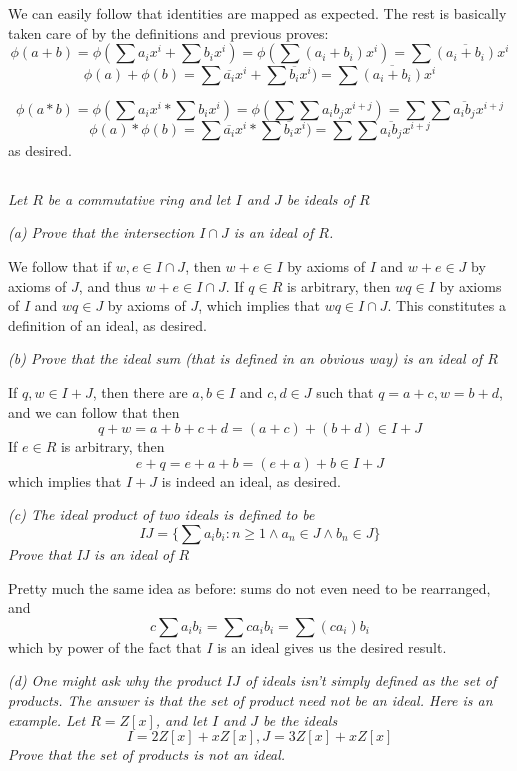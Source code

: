 \documentclass[11pt,oneside,titlepage]{book}
\newcommand{\set}[1]{\{ #1 \}}
\begin{document}
We can easily follow that identities are mapped as expected. The rest is basically taken care of
by the definitions and previous proves:
$$\phi(a + b) = \phi(\sum {a_i x^i} + \sum {b_i x^i}) = \phi(\sum {(a_i + b_i) x^i}) =
\sum {\overline{(a_i + b_i)} x^i}$$
$$\phi(a)  + \phi(b) = \sum {\overline{a_i} x^i} + \sum {\overline{b_i} x^i}) =
\sum {\overline{(a_i + b_i)} x^i}$$


$$\phi(a * b) = \phi(\sum {a_i x^i} * \sum {b_i x^i}) = \phi(\sum{\sum {a_i b_j x^{i + j}}}) =
\sum{\sum {\overline{a_i b_j} x^{i + j}}}$$
$$\phi(a) * \phi(b) = \sum {\overline{a_i} x^i} * \sum {\overline{b_i} x^i})
= \sum{\sum {\overline{a_i b_j} x^{i + j}}}$$
as desired.

\subsection{}

\textit{Let $R$ be a commutative ring and let $I$ and $J$ be ideals of $R$}

\textit{(a) Prove that the intersection $I \cap J$ is an ideal of $R$.}

We follow that if $w, e \in I \cap J$, then $w + e \in I$ by axioms of
$I$ and $w + e \in J$ by axioms of $J$, and thus $w + e \in I \cap
J$. If $q \in R$ is arbitrary, then $wq \in I$ by axioms of $I$ and
$wq \in J$ by axioms of $J$, which implies that $wq \in I \cap
J$. This constitutes a definition of an ideal, as desired.

\textit{(b) Prove that the ideal sum (that is defined in an obvious
way) is an ideal of $R$ }

If $q, w \in I + J$, then there are $a, b \in I$ and $c, d \in J$ such
that $q = a + c, w = b + d$, and we can follow that then
$$q + w = a + b + c + d = (a + c) + (b + d) \in I + J$$
If $e \in R$ is arbitrary, then
$$e + q = e + a + b = (e + a) + b \in I + J$$
which implies that $I + J$ is indeed an ideal, as desired.

\textit{(c) The ideal product of two ideals is defined to be
  $$IJ = \set{\sum{a_i b_i}: n \geq 1 \land a_n \in J \land b_n \in J}$$
  Prove that IJ is an ideal of $R$}

Pretty much the same idea as before: sums do not even need to be rearranged,
and
$$c\sum{a_i b_i} = \sum{c a_i b_i} = \sum{(c a_i) b_i}$$
which by power of the fact that $I$ is an ideal gives us the desired result.

\textit{(d) One might ask why the product $IJ$ of ideals isn't simply
defined as the set of products. The answer is that the set of product
need not be an ideal. Here is an example. Let $R = Z[x]$, and let $I$
and $J$ be the ideals
$$I = 2Z[x] + xZ[x], J = 3Z[x] + xZ[x]$$
Prove  that the set of products is not an ideal.}
\end{document}
